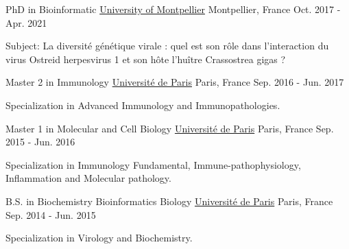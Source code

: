 

\begin{cventries}

  \cventry
    {PhD in Bioinformatic} %
    {\href{https://www.umontpellier.fr/en/}{University of Montpellier}} %
    {Montpellier, France} %
    {Oct. 2017 - Apr. 2021} %
    {
      \begin{cvitems} %
        \item {Subject: La diversité génétique virale : quel est son rôle dans l'interaction du virus Ostreid herpesvirus 1 et son hôte l’huître Crassostrea gigas ?}
      \end{cvitems}
    }

  \cventry
    {Master 2 in Immunology} %
    {\href{https://u-paris.fr/en/universite-de-paris/}{Université de Paris}} %
    {Paris, France} %
    {Sep. 2016 - Jun. 2017} %
    {
      \begin{cvitems} %
        \item {Specialization in Advanced Immunology and Immunopathologies.}
      \end{cvitems}
    }

  \cventry
    {Master 1 in  Molecular and Cell Biology} %
    {\href{https://u-paris.fr/en/universite-de-paris/}{Université de Paris}} %
    {Paris, France} %
    {Sep. 2015 - Jun. 2016} %
    {
      \begin{cvitems} %
        \item {Specialization in Immunology Fundamental, Immune-pathophysiology, Inflammation and Molecular pathology.}
      \end{cvitems}
    }

  \cventry
    {B.S. in Biochemistry Bioinformatics Biology} %
    {\href{https://u-paris.fr/en/universite-de-paris/}{Université de Paris}} %
    {Paris, France} %
    {Sep. 2014 - Jun. 2015} %
    {
      \begin{cvitems} %
        \item {Specialization in Virology and Biochemistry.}
      \end{cvitems}
    }
    

\end{cventries}
